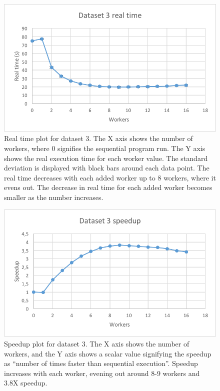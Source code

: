 \begin{figure}[ht]
  \centering
  \includegraphics[width=120mm]{figures/dataset_3/dataset_3_real_time.png}
  \caption[Real time plot for dataset 3.]{Real time plot for dataset 3. The X axis shows the number of workers, where 0 signifies the sequential program run.
  The Y axis shows the real execution time for each worker value. The standard deviation is displayed with black bars around each data point. The real time
  decreases with each added worker up to 8 workers, where it evens out. The decrease in real time for each added worker becomes smaller as the number increases.}
  \label{fig:dataset_3_real_time}
\end{figure}

\begin{figure}[ht]
  \centering
  \includegraphics[width=120mm]{figures/dataset_3/dataset_3_speedup.png}
  \caption[Speedup plot for dataset 3.]{Speedup plot for dataset 3. The X axis shows the number of workers, and the Y axis shows a scalar value signifying the speedup as
  ``number of times faster than sequential execution''. Speedup increases with each worker, evening out around 8-9 workers and 3.8X speedup.}
  \label{fig:dataset_3_speedup}
\end{figure}

